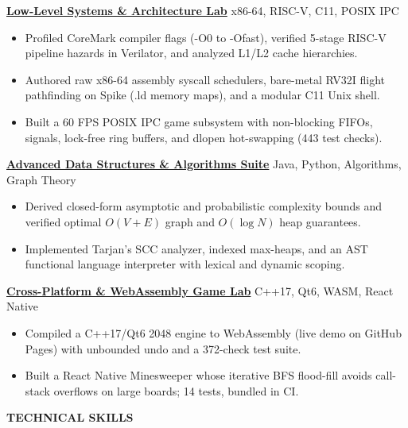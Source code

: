\documentclass[a4paper]{article}
\newcommand{\sechead}[1]{%
    \vspace{3.8pt}%
    {\centering\fontsize{10.2}{12.2}\textbf{\MakeUppercase{#1}}\par}%
    \vspace{1.8pt}%
}
\newcommand{\entry}[2]{%
    {\fontsize{9.2}{11.5}\textbf{#1}} \hfill {\fontsize{8.4}{10.6}\selectfont #2} \par
}
\newcommand{\desc}[1]{%
    {\fontsize{8.0}{10.2}\selectfont #1}%
}
\begin{document}
\entry{\href{https://github.com/yigitsarpavci/low-level-systems-lab}{Low-Level Systems \& Architecture Lab}}{x86-64, RISC-V, C11, POSIX IPC}
\begin{itemize}[leftmargin=1.1em, itemsep=0.5pt, parsep=0pt, topsep=0.6pt]
   \item \desc{Profiled CoreMark compiler flags (-O0 to -Ofast), verified 5-stage RISC-V pipeline hazards in Verilator, and analyzed L1/L2 cache hierarchies.}
   \item \desc{Authored raw x86-64 assembly syscall schedulers, bare-metal RV32I flight pathfinding on Spike (.ld memory maps), and a modular C11 Unix shell.}
   \item \desc{Built a 60 FPS POSIX IPC game subsystem with non-blocking FIFOs, signals, lock-free ring buffers, and dlopen hot-swapping (443 test checks).}
\end{itemize}
\vspace{1.5pt}

\entry{\href{https://github.com/yigitsarpavci/data-structures-and-algorithms-suite}{Advanced Data Structures \& Algorithms Suite}}{Java, Python, Algorithms, Graph Theory}
\begin{itemize}[leftmargin=1.1em, itemsep=0.5pt, parsep=0pt, topsep=0.6pt]
   \item \desc{Derived closed-form asymptotic and probabilistic complexity bounds and verified optimal $O(V+E)$ graph and $O(\log N)$ heap guarantees.}
   \item \desc{Implemented Tarjan's SCC analyzer, indexed max-heaps, and an AST functional language interpreter with lexical and dynamic scoping.}
\end{itemize}
\vspace{1.5pt}

\entry{\href{https://github.com/yigitsarpavci/cross-platform-game-lab}{Cross-Platform \& WebAssembly Game Lab}}{C++17, Qt6, WASM, React Native}
\begin{itemize}[leftmargin=1.1em, itemsep=0.5pt, parsep=0pt, topsep=0.6pt]
   \item \desc{Compiled a C++17/Qt6 2048 engine to WebAssembly (live demo on GitHub Pages) with unbounded undo and a 372-check test suite.}
   \item \desc{Built a React Native Minesweeper whose iterative BFS flood-fill avoids call-stack overflows on large boards; 14 tests, bundled in CI.}
\end{itemize}

\sechead{Technical Skills}
\end{document}
